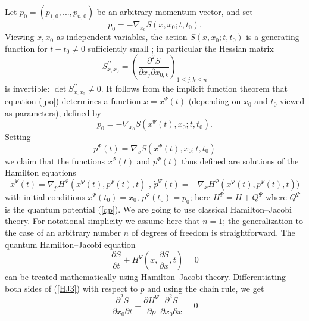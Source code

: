 \documentclass[12pt]{article}%
\begin{document}
Let $p_{0}=(p_{1,0},...,p_{n,0})$ be an arbitrary momentum vector, and set%
\begin{equation}
p_{0}=-\nabla_{x_{0}}S(x,x_{0};t,t_{0}). \label{po}%
\end{equation}
Viewing $x,x_{0}$ as independent variables, the action $S(x,x_{0};t,t_{0})$ is
a generating function for $t-t_{0}\neq0$ sufficiently small
\cite{Arnold,HGoldstein,ICP,Birk}; in particular the Hessian matrix
\begin{equation}
S_{x,x_{0}}^{\prime\prime}=\left(  \frac{\partial^{2}S}{\partial x_{j}\partial
x_{0,k}}\right)  _{1\leq j,k\leq n} \label{hessian}%
\end{equation}
is invertible: $\det S_{x,x_{0}}^{\prime\prime}\neq0$. It follows from the
implicit function theorem that equation (\ref{po}) determines a function
$x=x^{\Psi}(t)$ (depending on $x_{0}$ and $t_{0}$ viewed as parameters),
defined by
\begin{equation}
p_{0}=-\nabla_{x_{0}}S(x^{\Psi}(t),x_{0};t,t_{0}). \label{pot}%
\end{equation}
Setting
\begin{equation}
p^{\Psi}(t)=\nabla_{x}S(x^{\Psi}(t),x_{0};t,t_{0}) \label{pt}%
\end{equation}
we claim that the functions $x^{\Psi}(t)$ and $p^{\Psi}(t)$ thus defined are
solutions of the Hamilton equations
\begin{equation}
\dot{x}^{\Psi}(t)=\nabla_{p}H^{\Psi}(x^{\Psi}(t),p^{\Psi}(t),t)\text{ ,
\ }\dot{p}^{\Psi}(t)=-\nabla_{x}H^{\Psi}(x^{\Psi}(t),p^{\Psi}(t),t))
\label{Hamilton}%
\end{equation}
with initial conditions $x^{\Psi}(t_{0})=x_{0}$, $p^{\Psi}(t_{0})=p_{0}$; here
$H^{\Psi}=H+Q^{\Psi}$ where $Q^{\Psi}$ is the quantum potential (\ref{qp}). We
are going to use classical Hamilton--Jacobi theory. For notational simplicity
we assume here that $n=1$; the generalization to the case of an arbitrary
number $n$ of degrees of freedom is straightforward. The quantum
Hamilton--Jacobi equation%
\begin{equation}
\frac{\partial S}{\partial t}+H^{\Psi}\left(  x,\frac{\partial S}{\partial
x},t\right)  =0 \label{HJ3}%
\end{equation}
can be treated mathematically using Hamilton--Jacobi theory. Differentiating
both sides of (\ref{HJ3}) with respect to $p$ and using the chain rule, we get%
\begin{equation}
\frac{\partial^{2}S}{\partial x_{0}\partial t}+\frac{\partial H^{\Psi}%
}{\partial p}\frac{\partial^{2}S}{\partial x_{0}\partial x}=0 \label{a}%
\end{equation}
\end{document}
